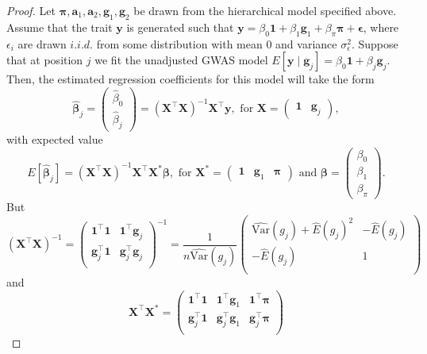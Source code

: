 \documentclass[12pt]{article}
\begin{document}
\begin{proof}
Let $\boldsymbol\pi, \mathbf{a}_1, \mathbf{a}_2, \mathbf{g}_1, \mathbf{g}_2$ be drawn from the hierarchical model specified above.
Assume that the trait $\mathbf{y}$ is generated such that $\mathbf{y} = \beta_0 \mathbf{1} + \beta_1 \mathbf{g}_1 + \beta_\pi \boldsymbol\pi + \boldsymbol\epsilon$, where $\epsilon_i$ are drawn $i.i.d.$ from some distribution with mean 0 and variance $\sigma_\epsilon^2$. 
Suppose that at position $j$ we fit the unadjusted GWAS model $E[\mathbf{y} \mid \mathbf{g}_j] = \beta_0 \mathbf{1} + \beta_j \mathbf{g}_j$. 
Then, the estimated regression coefficients for this model will take the form $$\hat{\boldsymbol\beta}_j = \begin{pmatrix} \hat{\beta}_0 \\ \hat{\beta}_j \end{pmatrix} = (\mathbf{X}^\top \mathbf{X})^{-1} \mathbf{X}^\top \mathbf{y}, \text{ for } \mathbf{X} = \begin{pmatrix} \mathbf{1} & \mathbf{g}_j \end{pmatrix},$$
with expected value $$E[\hat{\boldsymbol\beta}_j] = (\mathbf{X}^\top \mathbf{X})^{-1} \mathbf{X}^\top \mathbf{X}^{*}\boldsymbol\beta, \text{ for } \mathbf{X}^* = \begin{pmatrix} \mathbf{1} & \mathbf{g}_1 & \boldsymbol\pi \end{pmatrix} \text{ and } \boldsymbol\beta = \begin{pmatrix} \beta_0 \\ \beta_1 \\ \beta_\pi \end{pmatrix}.$$
But $$(\mathbf{X}^\top \mathbf{X})^{-1} = \begin{pmatrix} 
\mathbf{1}^\top \mathbf{1} & \mathbf{1}^\top \mathbf{g}_j \\
\mathbf{g}_j^\top \mathbf{1} & \mathbf{g}_j^\top \mathbf{g}_j \\
\end{pmatrix}^{-1} 
= \frac{1}{n\widehat{\text{Var}}(g_j)} \begin{pmatrix}
\widehat{\text{Var}}(g_j) + \hat{E}(g_j)^2 & -\hat{E}(g_j) \\
-\hat{E}(g_j) & 1 \\ 
\end{pmatrix}$$ 
and $$\mathbf{X}^\top \mathbf{X}^{*} = \begin{pmatrix}
\mathbf{1}^\top \mathbf{1} & \mathbf{1}^\top \mathbf{g}_1 & \mathbf{1}^\top \boldsymbol\pi \\
\mathbf{g}_j^\top \mathbf{1} & \mathbf{g}_j^\top \mathbf{g}_1 & \mathbf{g}_j^\top \boldsymbol\pi \\

\end{pmatrix}$$
\end{proof}
\end{document}
